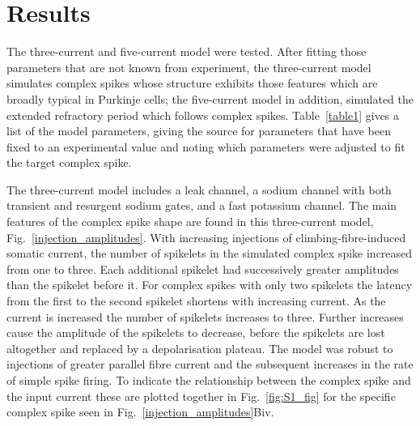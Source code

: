 \documentclass[utf8]{frontiersSCNS} %
\begin{document}
\section{Results}

The three-current and five-current model were tested. After fitting
those parameters that are not known from experiment, the three-current
model simulates complex spikes whose structure exhibits those features
which are broadly typical in Purkinje cells; the five-current model in
addition, simulated the extended refractory period which follows
complex spikes. Table~\ref{table1} gives a list of the model
parameters, giving the source for parameters that have been fixed to
an experimental value and noting which parameters were adjusted to
fit the target complex spike.

The three-current model includes a leak channel, a sodium channel with
both transient and resurgent sodium gates, and a fast potassium
channel. The main features of the complex spike shape are found in
this three-current model, Fig.~\ref{injection_amplitudes}. With
increasing injections of climbing-fibre-induced somatic current, the
number of spikelets in the simulated complex spike increased from one
to three. Each additional spikelet had successively greater amplitudes
than the spikelet before it. For complex spikes with only two
spikelets the latency from the first to the second spikelet shortens
with increasing current. As the current is increased the number of
spikelets increases to three. Further increases cause the amplitude of
the spikelets to decrease, before the spikelets are lost altogether
and replaced by a depolarisation plateau. The model was robust to
injections of greater parallel fibre current and the subsequent
increases in the rate of simple spike firing. To indicate the
relationship between the complex spike and the input current these are
plotted together in Fig.~\ref{fig:S1_fig} for the specific complex
spike seen in Fig.~\ref{injection_amplitudes}Biv.


\end{document}
